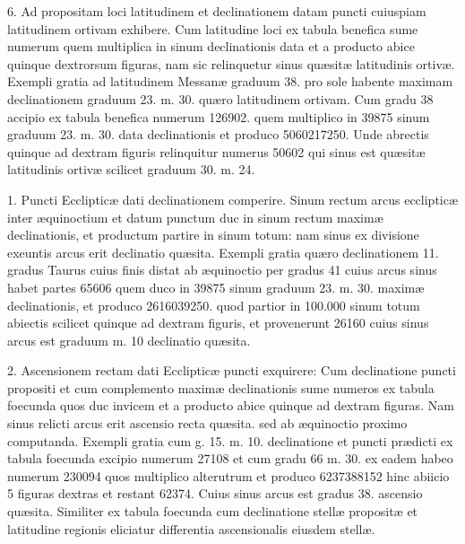\documentclass[11pt,a4paper]{article}
\begin{document}
6. Ad propositam loci latitudinem et declinationem datam puncti cuiuspiam latitudinem ortivam exhibere. Cum latitudine  loci ex tabula benefica sume numerum quem multiplica in sinum declinationis data et a producto abice quinque dextrorsum figuras, nam sic relinquetur sinus quæsitæ latitudinis ortivæ. Exempli gratia ad latitudinem Messanæ graduum 38. pro sole habente maximam declinationem graduum 23. m. 30. quæro latitudinem ortivam. Cum gradu 38 accipio ex tabula benefica numerum 126902. quem multiplico in 39875 sinum graduum 23. m. 30. data declinationis et produco 5060217250. Unde abrectis quinque ad dextram figuris relinquitur numerus 50602 qui sinus est quæsitæ latitudinis ortivæ scilicet graduum 30. m. 24.


1. Puncti Ecclipticæ dati declinationem comperire. Sinum rectum arcus ecclipticæ inter æquinoctium et datum punctum duc in sinum rectum maximæ declinationis, et productum partire in sinum totum: nam sinus ex divisione exeuntis arcus erit declinatio quæsita. Exempli gratia quæro declinationem 11. gradus Taurus cuius finis distat ab æquinoctio per gradus 41 cuius arcus sinus habet partes 65606 quem duco in 39875 sinum graduum 23. m. 30. maximæ declinationis, et produco 2616039250. quod partior in 100.000 sinum totum abiectis scilicet quinque ad dextram figuris, et provenerunt 26160 cuius sinus arcus est  graduum m. 10 declinatio quæsita.

2. Ascensionem rectam dati Ecclipticæ puncti exquirere: Cum declinatione puncti propositi et cum complemento maximæ declinationis sume numeros ex tabula foecunda quos duc  invicem et a producto abice quinque ad dextram figuras. Nam sinus relicti arcus erit ascensio recta quæsita. sed ab æquinoctio proximo computanda. Exempli gratia cum g. 15. m. 10. declinatione et puncti prædicti ex tabula foecunda excipio numerum 27108 et cum gradu 66 m. 30. ex eadem habeo numerum 230094 quos multiplico alterutrum et produco 6237388152 hinc abiicio 5 figuras dextras et restant 62374. Cuius sinus arcus est gradus 38. ascensio quæsita. Similiter ex tabula foecunda cum declinatione stellæ propositæ et latitudine regionis eliciatur differentia ascensionalis eiusdem stellæ.
\end{document}
